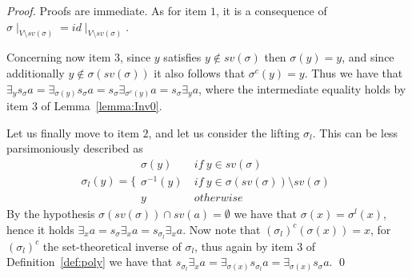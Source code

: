 \documentclass{llncs}
\begin{document}
\begin{proof}
Proofs are immediate.
As for item $1$, it is a consequence of $\sigma \mid_{V \setminus sv(\sigma)} = id \mid_{V \setminus sv(\sigma)}$.

Concerning now item $3$, since $y$ satisfies $y \not \in sv(\sigma)$ then $\sigma(y) = y$,
and since additionally $y \not \in \sigma(sv(\sigma))$ it also follows that $\sigma^{c}(y) = y$. Thus
we have that 
$\exists_y s_{\sigma} a = \exists_{\sigma(y)} s_{\sigma} a = s_{\sigma} \exists_{\sigma^{c}(y)} a = s_{\sigma} \exists_y a$,
where the intermediate equality holds by item 3 of Lemma~\ref{lemma:Inv0}.

Let us finally move to item $2$, and let us consider the lifting $\sigma_l$. This can be less parsimoniously described as
%
$$\sigma_l(y) = \bigg \{\begin{array}{ll}
	\sigma(y) & \ \mathit{if} \ y \in sv(\sigma) \\
	\sigma^{-1}(y) & \ \mathit{if} \ y \in \sigma(sv(\sigma)) \setminus sv(\sigma) \\
	y & \ otherwise
	\end{array}$$
By the hypothesis $\sigma(sv(\sigma)) \cap sv(a) = \emptyset$ we have that $\sigma(x) = \sigma^l(x)$,
%
hence it holds $\exists_x a = s_{\sigma} \exists_x a = s_{\sigma_l} \exists_x a$.
%
Now note that $(\sigma_l)^{c}(\sigma(x)) = x$, for $(\sigma_l)^{c}$ the set-theoretical inverse of $\sigma_l$, 
thus again by item $3$ of Definition~\ref{def:poly} we have that $s_{\sigma_l} \exists_x a = \exists_{\sigma(x)} s_{\sigma_l} a = \exists_{\sigma(x)} s_{\sigma} a$.
\qed
\end{proof}
\end{document}
